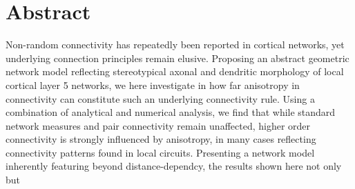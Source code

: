 \begingroup
\let\clearpage\relax
\let\cleardoublepage\relax
\let\cleardoublepage\relax

\chapter*{Abstract}

Non-random connectivity has repeatedly been reported in cortical
networks, yet underlying connection principles remain
elusive. Proposing an abstract geometric network model reflecting
stereotypical axonal and dendritic morphology of local cortical layer
5 networks, we here investigate in how far anisotropy in connectivity
can constitute such an underlying connectivity rule. Using a
combination of analytical and numerical analysis, we find that while
standard network measures and pair connectivity remain unaffected,
higher order connectivity is strongly influenced by anisotropy, in
many cases reflecting connectivity patterns found in local
circuits. Presenting a network model inherently featuring beyond
distance-dependcy, the results shown here not only but







\endgroup			

\vfill

